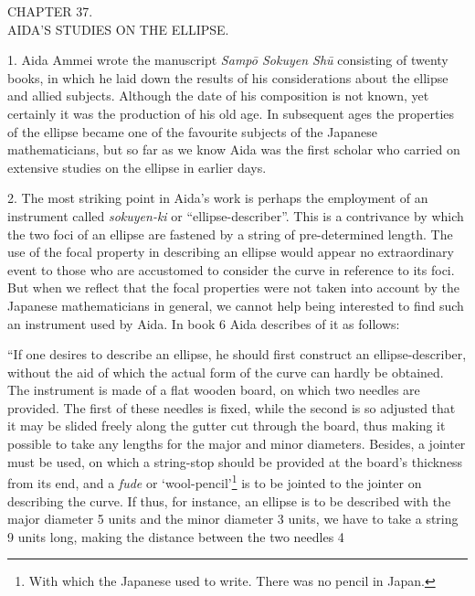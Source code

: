 \documentclass[11pt]{article}
\newcommand{\scanpage}[2]{\clearpage\setcounter{footnote}{0}\noindent{\footnotesize\color{gray}PDF page #1 · #2}\par\medskip}
\begin{document}
\scanpage{0263}{Chapter 37 opening, printed page 249}
\begin{center}
CHAPTER 37.\\[1mm]
AIDA'S STUDIES ON THE ELLIPSE.
\end{center}

1. Aida Ammei wrote the manuscript \emph{Sampō Sokuyen Shū} consisting of twenty books, in which he laid down the results of his considerations about the ellipse and allied subjects. Although the date of his composition is not known, yet certainly it was the production of his old age. In subsequent ages the properties of the ellipse became one of the favourite subjects of the Japanese mathematicians, but so far as we know Aida was the first scholar who carried on extensive studies on the ellipse in earlier days.

2. The most striking point in Aida's work is perhaps the employment of an instrument called \emph{sokuyen-ki} or ``ellipse-describer''. This is a contrivance by which the two foci of an ellipse are fastened by a string of pre-determined length. The use of the focal property in describing an ellipse would appear no extraordinary event to those who are accustomed to consider the curve in reference to its foci. But when we reflect that the focal properties were not taken into account by the Japanese mathematicians in general, we cannot help being interested to find such an instrument used by Aida. In book 6 Aida describes of it as follows:

``If one desires to describe an ellipse, he should first construct an ellipse-describer, without the aid of which the actual form of the curve can hardly be obtained. The instrument is made of a flat wooden board, on which two needles are provided. The first of these needles is fixed, while the second is so adjusted that it may be slided freely along the gutter cut through the board, thus making it possible to take any lengths for the major and minor diameters. Besides, a jointer must be used, on which a string-stop should be provided at the board's thickness from its end, and a \emph{fude} or `wool-pencil'\footnote{With which the Japanese used to write. There was no pencil in Japan.} is to be jointed to the jointer on describing the curve. If thus, for instance, an ellipse is to be described with the major diameter 5 units and the minor diameter 3 units, we have to take a string 9 units long, making the distance between the two needles 4
\end{document}
